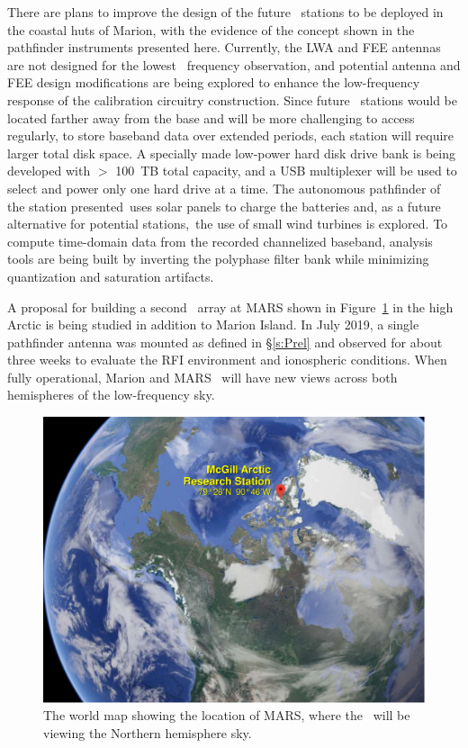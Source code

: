 There are plans to improve the design of the future \albatros\ stations to be deployed in the coastal huts of Marion, with the evidence of the concept shown in the pathfinder instruments presented here. Currently, the LWA and FEE antennas are not designed for the lowest \albatros\ frequency observation, and potential antenna and FEE design modifications are being explored to enhance the low-frequency response of the calibration circuitry construction. Since future \albatros\ stations would be located farther away from the base and will be more challenging to access regularly, to store baseband data over extended periods, each station will require larger total disk space. A specially made low-power hard disk drive bank is being developed with $>$ 100~TB total capacity, and a USB multiplexer will be used to select and power only one hard drive at a time. The autonomous pathfinder of the station presented uses solar panels to charge the batteries and, as a future alternative for potential stations, the use of small wind turbines is explored. To compute time-domain data from the recorded channelized baseband, analysis tools are being built by inverting the polyphase filter bank while minimizing quantization and saturation artifacts.

A proposal for building a second \albatros\ array at MARS shown in Figure~\ref{Fig:MARS} in the high Arctic is being studied in addition to Marion Island. In July 2019, a single pathfinder antenna was mounted as defined in \S\ref{s:Prel} and observed for about three weeks to evaluate the RFI environment and ionospheric conditions. When fully operational, Marion and MARS \albatros\ will have new views across both hemispheres of the low-frequency sky.

\begin{figure}
	\centering
	\includegraphics[width=\linewidth]{Figures/MARS.pdf}
	\caption{The world map showing the location of MARS, where the \albatros\ will be viewing the Northern hemisphere sky.}
	\label{Fig:MARS}
\end{figure}

